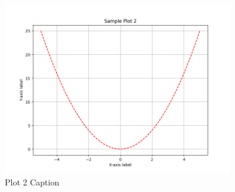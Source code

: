 \documentclass[class=book, crop=false]{standalone}
\begin{document}
\paragraph*{}
\blindmathpaper

\cite{latex2e}

\begin{figure}[htbp]
    \centering
    \includegraphics[width=10cm]{../../../figures_and_plots/plots/plot2.png}
    \caption{Plot 2 Caption}
    \label{fig:plot2}
\end{figure}
\end{document}
